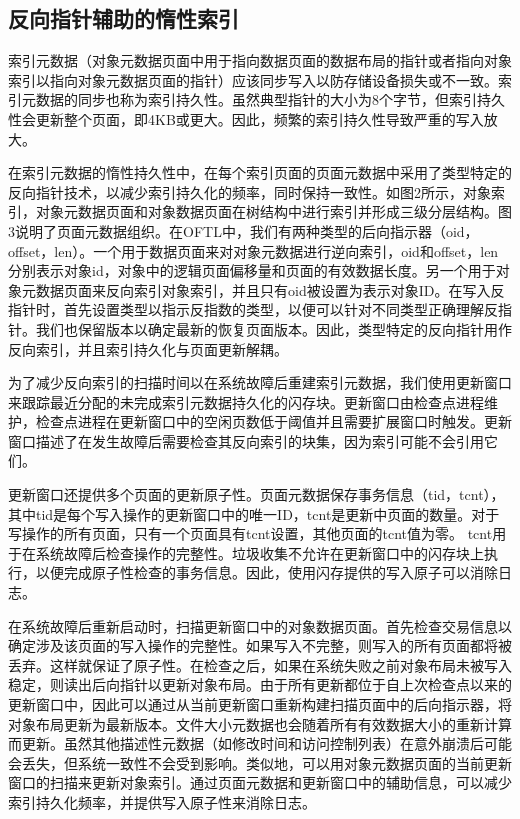 \subsection{反向指针辅助的惰性索引}
索引元数据（对象元数据页面中用于指向数据页面的数据布局的指针或者指向对象索引以指向对象元数据页面的指针）应该同步写入以防存储设备损失或不一致。索引元数据的同步也称为索引持久性。虽然典型指针的大小为8个字节，但索引持久性会更新整个页面，即4KB或更大。因此，频繁的索引持久性导致严重的写入放大。

在索引元数据的惰性持久性中，在每个索引页面的页面元数据中采用了类型特定的反向指针技术，以减少索引持久化的频率，同时保持一致性。如图2所示，对象索引，对象元数据页面和对象数据页面在树结构中进行索引并形成三级分层结构。图3说明了页面元数据组织。在OFTL中，我们有两种类型的后向指示器（oid，offset，len）。一个用于数据页面来对对象元数据进行逆向索引，oid和offset，len分别表示对象id，对象中的逻辑页面偏移量和页面的有效数据长度。另一个用于对象元数据页面来反向索引对象索引，并且只有oid被设置为表示对象ID。在写入反指针时，首先设置类型以指示反指数的类型，以便可以针对不同类型正确理解反指针。我们也保留版本以确定最新的恢复页面版本。因此，类型特定的反向指针用作反向索引，并且索引持久化与页面更新解耦。

为了减少反向索引的扫描时间以在系统故障后重建索引元数据，我们使用更新窗口来跟踪最近分配的未完成索引元数据持久化的闪存块。更新窗口由检查点进程维护，检查点进程在更新窗口中的空闲页数低于阈值并且需要扩展窗口时触发。更新窗口描述了在发生故障后需要检查其反向索引的块集，因为索引可能不会引用它们。

更新窗口还提供多个页面的更新原子性。页面元数据保存事务信息（tid，tcnt），其中tid是每个写入操作的更新窗口中的唯一ID，tcnt是更新中页面的数量。对于写操作的所有页面，只有一个页面具有tcnt设置，其他页面的tcnt值为零。 tcnt用于在系统故障后检查操作的完整性。垃圾收集不允许在更新窗口中的闪存块上执行，以便完成原子性检查的事务信息。因此，使用闪存提供的写入原子可以消除日志。

在系统故障后重新启动时，扫描更新窗口中的对象数据页面。首先检查交易信息以确定涉及该页面的写入操作的完整性。如果写入不完整，则写入的所有页面都将被丢弃。这样就保证了原子性。在检查之后，如果在系统失败之前对象布局未被写入稳定，则读出后向指针以更新对象布局。由于所有更新都位于自上次检查点以来的更新窗口中，因此可以通过从当前更新窗口重新构建扫描页面中的后向指示器，将对象布局更新为最新版本。文件大小元数据也会随着所有有效数据大小的重新计算而更新。虽然其他描述性元数据（如修改时间和访问控制列表）在意外崩溃后可能会丢失，但系统一致性不会受到影响。类似地，可以用对象元数据页面的当前更新窗口的扫描来更新对象索引。通过页面元数据和更新窗口中的辅助信息，可以减少索引持久化频率，并提供写入原子性来消除日志。

